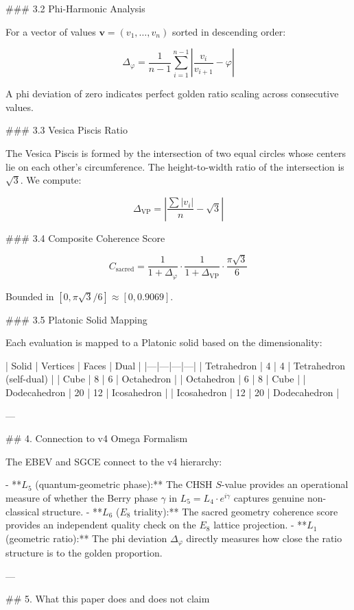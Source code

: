 ### 3.2 Phi-Harmonic Analysis

For a vector of values \( \mathbf{v} = (v_1, \ldots, v_n) \) sorted in descending order:

\[
\Delta_\varphi = \frac{1}{n-1} \sum_{i=1}^{n-1} \left| \frac{v_i}{v_{i+1}} - \varphi \right|
\]

A phi deviation of zero indicates perfect golden ratio scaling across consecutive values.

### 3.3 Vesica Piscis Ratio

The Vesica Piscis is formed by the intersection of two equal circles whose centers lie on each other's circumference. The height-to-width ratio of the intersection is \( \sqrt{3} \). We compute:

\[
\Delta_{\text{VP}} = \left| \frac{\sum |v_i|}{n} - \sqrt{3} \right|
\]

### 3.4 Composite Coherence Score

\[
C_{\text{sacred}} = \frac{1}{1 + \Delta_\varphi} \cdot \frac{1}{1 + \Delta_{\text{VP}}} \cdot \frac{\pi\sqrt{3}}{6}
\]

Bounded in \( [0, \pi\sqrt{3}/6] \approx [0, 0.9069] \).

### 3.5 Platonic Solid Mapping

Each evaluation is mapped to a Platonic solid based on the dimensionality:

| Solid | Vertices | Faces | Dual |
|---|---|---|---|
| Tetrahedron | 4 | 4 | Tetrahedron (self-dual) |
| Cube | 8 | 6 | Octahedron |
| Octahedron | 6 | 8 | Cube |
| Dodecahedron | 20 | 12 | Icosahedron |
| Icosahedron | 12 | 20 | Dodecahedron |

---

## 4. Connection to v4 Omega Formalism

The EBEV and SGCE connect to the v4 hierarchy:

- **\( L_5 \) (quantum-geometric phase):** The CHSH \( S \)-value provides an operational measure of whether the Berry phase \( \gamma \) in \( L_5 = L_4 \cdot e^{i\gamma} \) captures genuine non-classical structure.
- **\( L_6 \) (\( E_8 \) triality):** The sacred geometry coherence score provides an independent quality check on the \( E_8 \) lattice projection.
- **\( L_1 \) (geometric ratio):** The phi deviation \( \Delta_\varphi \) directly measures how close the ratio structure is to the golden proportion.

---

## 5. What this paper does and does not claim

